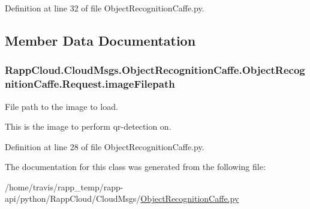 Definition at line 32 of file Object\-Recognition\-Caffe.\-py.



\subsection{Member Data Documentation}
\hypertarget{classRappCloud_1_1CloudMsgs_1_1ObjectRecognitionCaffe_1_1ObjectRecognitionCaffe_1_1Request_ad187c6d8542e98e826ea3c293ba76873}{
\subsubsection[{image\-Filepath}]{\setlength{\rightskip}{0pt plus 5cm}Rapp\-Cloud.\-Cloud\-Msgs.\-Object\-Recognition\-Caffe.\-Object\-Recognition\-Caffe.\-Request.\-image\-Filepath}}\label{classRappCloud_1_1CloudMsgs_1_1ObjectRecognitionCaffe_1_1ObjectRecognitionCaffe_1_1Request_ad187c6d8542e98e826ea3c293ba76873}


File path to the image to load. 

This is the image to perform qr-\/detection on. 

Definition at line 28 of file Object\-Recognition\-Caffe.\-py.



The documentation for this class was generated from the following file\-:\begin{DoxyCompactItemize}
\item 
/home/travis/rapp\-\_\-temp/rapp-\/api/python/\-Rapp\-Cloud/\-Cloud\-Msgs/\hyperlink{ObjectRecognitionCaffe_8py}{Object\-Recognition\-Caffe.\-py}\end{DoxyCompactItemize}
